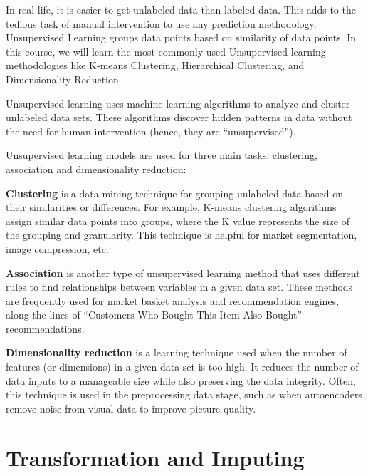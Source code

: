 In real life, it is easier to get unlabeled data than labeled data. This adds to the tedious task of manual intervention to use any prediction methodology. Unsupervised Learning groups data points based on similarity of data points. In this course, we will learn the most commonly used Unsupervised learning methodologies like K-means Clustering, Hierarchical Clustering, and Dimensionality Reduction.

Unsupervised learning uses machine learning algorithms to analyze and cluster unlabeled data sets. These algorithms discover hidden patterns in data without the need for human intervention (hence, they are ``unsupervised'').

Unsupervised learning models are used for three main tasks: clustering, association and dimensionality reduction:
	\begin{bulletedlist}
	\item \textbf{Clustering} is a data mining technique for grouping unlabeled data based on their similarities or differences. For example, K-means clustering algorithms assign similar data points into groups, where the K value represents the size of the grouping and granularity. This technique is helpful for market segmentation, image compression, etc.
	\item \textbf{Association} is another type of unsupervised learning method that uses different rules to find relationships between variables in a given data set. These methods are frequently used for market basket analysis and recommendation engines, along the lines of ``Customers Who Bought This Item Also Bought'' recommendations.
	\item \textbf{Dimensionality reduction} is a learning technique used when the number of features  (or dimensions) in a given data set is too high. It reduces the number of data inputs to a manageable size while also preserving the data integrity. Often, this technique is used in the preprocessing data stage, such as when autoencoders remove noise from visual data to improve picture quality.
	\end{bulletedlist}


	\section{Transformation and Imputing}


